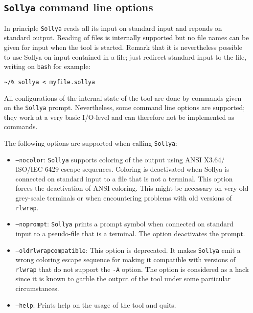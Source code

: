 \documentclass[a4paper]{article}
\newcommand{\sollya}{\texttt{Sollya}\xspace}
\begin{document}
\subsection{\sollya command line options}

In principle \sollya reads all its input on standard input and reponds
on standard output. Reading of files is internally supported but no
file names can be given for input when the tool is started. Remark that 
it is nevertheless possible to use Sollya on input contained in a file; 
just redirect standard input to the file, writing on \texttt{bash} for example:
\begin{center}\begin{minipage}{15cm}\begin{Verbatim}[frame=single]
~/% sollya < myfile.sollya 
\end{Verbatim}
\end{minipage}\end{center}

All configurations of the internal state of the tool are done by
commands given on the \sollya prompt. Nevertheless, some command line
options are supported; they work at a very basic I/O-level and can
therefore not be implemented as commands.

The following options are supported when calling \sollya:
\begin{itemize}
\item \texttt{--nocolor}: \sollya supports coloring of the output
  using ANSI X3.64/ ISO/IEC 6429 escape sequences. Coloring is
  deactivated when Sollya is connected on standard input to a file
  that is not a terminal. This option forces the deactivation of ANSI
  coloring. This might be necessary on very old grey-scale terminals or when
  encountering problems with old versions of \texttt{rlwrap}. 
\item \texttt{--noprompt}: \sollya prints a prompt symbol when
  connected on standard input to a pseudo-file that is a terminal. The
  option deactivates the prompt.
\item \texttt{--oldrlwrapcompatible}: This option is deprecated. It
  makes \sollya emit a wrong coloring escape sequence for making it
  compatible with versions of \texttt{rlwrap} that do not support the
  \texttt{-A} option. The option is considered as a hack since it is
  known to garble the output of the tool under some particular
  circumstances.
\item \texttt{--help}: Prints help on the usage of the tool and quits.
\end{itemize}
\end{document}
